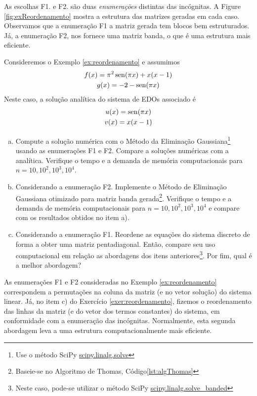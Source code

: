 \begin{ex}
As escolhas F1. e F2. são duas \emph{enumerações} distintas das incógnitas. A Figure \ref{fig:exReordenamento} mostra a estrutura das matrizes geradas em cada caso. Observamos que a enumeração F1 a matriz gerada tem blocos bem estruturados. Já, a enumeração F2, nos fornece uma matriz banda, o que é uma estrutura mais eficiente.
\end{ex}

\begin{exer}\label{exer:reordenamento}
  Consideremos o Exemplo \ref{ex:reordenamento} e assumimos
  \begin{gather}
    f(x) = \pi^2\operatorname{sen}(\pi x) + x(x-1)\\
    g(x) = -2 - \operatorname{sen}(\pi x)
  \end{gather}
  Neste caso, a solução analítica do sistema de EDOs associado é
  \begin{gather}
    u(x) = \operatorname{sen}(\pi x)\\
    v(x) = x(x-1)
  \end{gather}
  \begin{enumerate}[a)]
  \item Compute a solução numérica com o Método da Eliminação Gaussiana\footnote{Use o método SciPy \href{https://docs.scipy.org/doc/scipy/reference/generated/scipy.linalg.solve.html}{scipy.linalg.solve}} usando as enumerações F1 e F2. Compare a soluções numéricas com a analítica. Verifique o tempo e a demanda de memória computacionais para $n=10, 10^2, 10^3, 10^4$.
  \item Considerando a enumeração F2. Implemente o Método de Eliminação Gaussiana otimizado para matriz banda gerada\footnote{Baseie-se no Algoritmo de Thomas, Código\ref{lst:algThomas}}. Verifique o tempo e a demanda de memória computacionais para $n=10, 10^2, 10^3, 10^4$ e compare com os resultados obtidos no item a).
  \item Considerando a enumeração F1. Reordene as equações do sistema discreto de forma a obter uma matriz pentadiagonal. Então, compare seu uso computacional em relação as abordagens dos itens anteriores\footnote{Neste caso, pode-se utilizar o método SciPy \href{https://docs.scipy.org/doc/scipy/reference/generated/scipy.linalg.solve_banded.html}{scipy.linalg.solve\_banded}}. Por fim, qual é a melhor abordagem?
  \end{enumerate}
\end{exer}

\begin{obs}
  As enumerações F1 e F2 consideradas no Exemplo \ref{ex:reordenamento} correspondem a permutações na coluna da matriz (e no vetor solução) do sistema linear. Já, no item c) do Exercício \ref{exer:reordenamento}, fizemos o reordenamento das linhas da matriz (e do vetor dos termos constantes) do sistema, em conformidade com a enumeração das incógnitas. Normalmente, esta segunda abordagem leva a uma estrutura computacionalmente mais eficiente.  
\end{obs}

